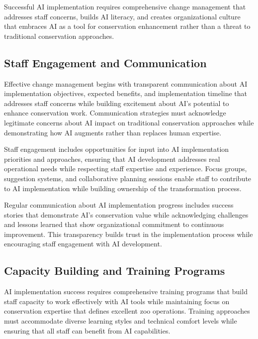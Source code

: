 \documentclass[
  Letterpaper,
]{scrbook}
\begin{document}
Successful AI implementation requires comprehensive change management
that addresses staff concerns, builds AI literacy, and creates
organizational culture that embraces AI as a tool for conservation
enhancement rather than a threat to traditional conservation approaches.

\subsection{Staff Engagement and
Communication}\label{staff-engagement-and-communication}

Effective change management begins with transparent communication about
AI implementation objectives, expected benefits, and implementation
timeline that addresses staff concerns while building excitement about
AI's potential to enhance conservation work. Communication strategies
must acknowledge legitimate concerns about AI impact on traditional
conservation approaches while demonstrating how AI augments rather than
replaces human expertise.

Staff engagement includes opportunities for input into AI implementation
priorities and approaches, ensuring that AI development addresses real
operational needs while respecting staff expertise and experience. Focus
groups, suggestion systems, and collaborative planning sessions enable
staff to contribute to AI implementation while building ownership of the
transformation process.

Regular communication about AI implementation progress includes success
stories that demonstrate AI's conservation value while acknowledging
challenges and lessons learned that show organizational commitment to
continuous improvement. This transparency builds trust in the
implementation process while encouraging staff engagement with AI
development.

\subsection{Capacity Building and Training
Programs}\label{capacity-building-and-training-programs}

AI implementation success requires comprehensive training programs that
build staff capacity to work effectively with AI tools while maintaining
focus on conservation expertise that defines excellent zoo operations.
Training approaches must accommodate diverse learning styles and
technical comfort levels while ensuring that all staff can benefit from
AI capabilities.
\end{document}
